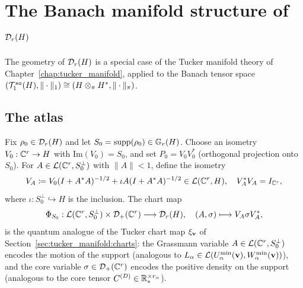 \section{The Banach manifold structure of $\mathcal{D}_{r}(H)$}
\label{sec:qs:manifold}

The geometry of $\mathcal{D}_{r}(H)$ is a special case of the Tucker manifold
theory of Chapter~\ref{chap:tucker_manifold}, applied to the Banach
tensor space $(\mathcal{T}_{1}^{sa}(H), \|\cdot\|_1) \cong (H \otimes_\pi H^*,
\|\cdot\|_\pi)$.

\subsection*{The atlas}

Fix $\rho_0 \in \mathcal{D}_{r}(H)$ and let $S_0 = \mathrm{supp}(\rho_0) \in
\mathbb{G}_{r}(H)$. Choose an isometry $V_0: \mathbb{C}^r \to H$ with
$\mathrm{Im}(V_0) = S_0$, and set $P_0 = V_0 V_0^*$ (orthogonal
projection onto $S_0$). For $A \in \mathcal{L}(\mathbb{C}^r, S_0^\perp)$ with
$\|A\| < 1$, define the isometry
\begin{equation}
\label{eq:qs:VA}
    V_A \coloneqq V_0(I + A^*A)^{-1/2} + \iota A (I + A^*A)^{-1/2}
    \in \mathcal{L}(\mathbb{C}^r, H),
    \quad V_A^* V_A = I_{\mathbb{C}^r},
\end{equation}
where $\iota: S_0^\perp \hookrightarrow H$ is the inclusion. The chart
map
\begin{equation}
\label{eq:qs:chart}
    \Phi_{S_0}: \mathcal{L}(\mathbb{C}^r, S_0^\perp) \times \mathcal{D}_+(\mathbb{C}^r)
    \longrightarrow \mathcal{D}_{r}(H),
    \quad (A, \sigma) \longmapsto V_A \sigma V_A^*,
\end{equation}
is the quantum analogue of the Tucker chart map $\xi_{\mathbf{v}}$
of Section~\ref{sec:tucker_manifold:charts}: the Grassmann variable
$A \in \mathcal{L}(\mathbb{C}^r, S_0^\perp)$ encodes the motion of the support
(analogous to $L_\alpha \in \mathcal{L}(U^{\min}_{\alpha}(\mathbf{v}), W^{\min}_{\alpha}(\mathbf{v}))$),
and the core variable $\sigma \in \mathcal{D}_+(\mathbb{C}^r)$ encodes the positive
density on the support (analogous to the core tensor $C^{(D)} \in
\mathbb{R}^{\times r_\alpha}_*$).

